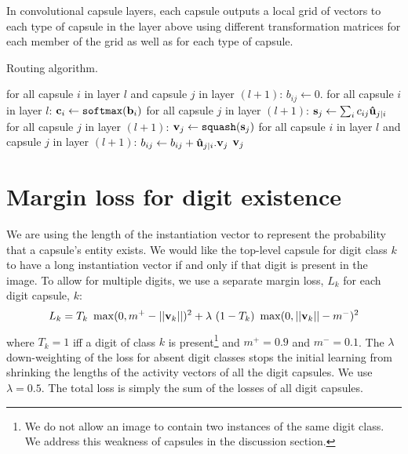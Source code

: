 \documentclass{article}
\begin{document}
In convolutional capsule layers, each capsule outputs a local grid of vectors to each type of capsule in the layer above using different transformation matrices for each member of the grid as well as for each type of capsule.

\begin{algorithm}
\caption{Routing algorithm.}\label{routingalg}
\begin{algorithmic}[1]
\State for all capsule $i$ in layer $l$ and capsule $j$ in layer $(l+1)$: $b_{ij} \gets 0$.
\State for all capsule $i$ in layer $l$: ${\bf c}_i \gets \texttt{softmax}({\bf b}_i)$ 
\State for all capsule $j$ in layer $(l+1)$: ${\bf s}_j \gets \sum_i{c_{ij}{\bf \hat u}_{j|i}}$
\State for all capsule $j$ in layer $(l+1)$: ${\bf v}_j \gets \texttt{squash}({\bf s}_j)$ 
\State for all capsule $i$ in layer $l$ and capsule $j$ in layer $(l+1)$: $b_{ij} \gets b_{ij} + {\bf \hat{u}}_{j|i} . {\bf v}_j$
\EndFor
\Return ${\bf v}_j$
\EndProcedure
\end{algorithmic}
\end{algorithm}
\section{Margin loss for digit existence}
We are using the length of the instantiation vector to represent the probability that a capsule's entity exists. We would like the top-level capsule for digit class $k$ to have a long instantiation vector if and only if that digit is present in the image. To allow for multiple digits, we use a separate margin loss, $L_k$ for each digit capsule, $k$:
\begin{equation}
L_k = T_k \ \max(0, m^{+} - ||{\bf v}_k||)^2 + \lambda \ (1-T_k) \ \max(0, ||{\bf v}_k|| - m^{-})^2
\label{digit-loss}
\end{equation}
where $T_k=1$ iff a digit of class $k$ is present\footnote{We do not allow an image to contain two instances of the same digit class. We address this weakness of capsules in the discussion section.} and $m^{+} = 0.9$ and $m^{-} = 0.1$. The $\lambda$ down-weighting of the loss for absent digit classes stops the initial learning from shrinking the lengths of the activity vectors of all the digit capsules. We use $\lambda=0.5$. The total loss is simply the sum of the losses of all digit capsules. 
\end{document}
